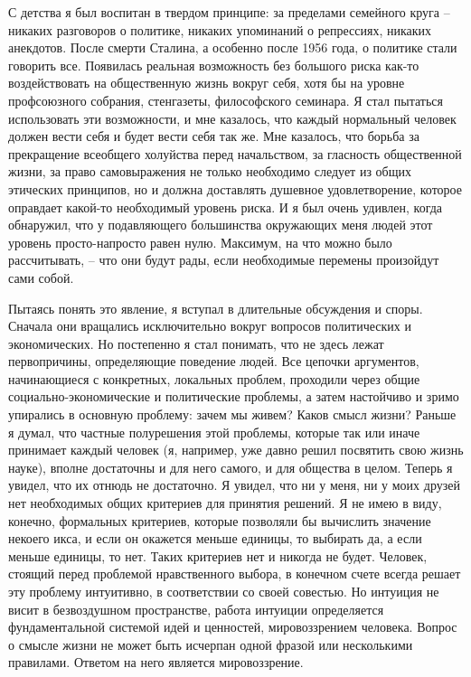 \documentclass{book}
\begin{document}
С детства я был воспитан в твердом принципе: за пределами семейного круга -- никаких разговоров о политике, никаких упоминаний о репрессиях, никаких анекдотов. После смерти Сталина, а особенно после 1956 года, о политике стали говорить все. Появилась реальная возможность без большого риска как-то воздействовать на общественную жизнь вокруг себя, хотя бы на уровне профсоюзного собрания, стенгазеты, фило­софского семинара. Я стал пытаться использовать эти возмож­ности, и мне казалось, что каждый нормальный человек должен вести себя и будет вести себя так же. Мне казалось, что борьба за прекращение всеобщего холуйства перед начальством, за гласность общественной жизни, за право самовыражения не только необходимо следует из общих этических принципов, но и должна доставлять душевное удовлетворение, которое оправдает какой-то необходимый уровень риска. И я был очень удивлен, когда обнаружил, что у подавляющего большинства окружающих меня людей этот уровень просто-напросто равен нулю. Максимум, на что можно было 
рассчитывать, -- что они будут рады, если необходимые перемены произойдут сами собой.

Пытаясь понять это явление, я вступал в длительные обсуж­дения и споры. Сначала они вращались исключительно вокруг вопросов политических и экономических. Но постепенно я стал понимать, что не здесь лежат первопричины, определяющие поведение людей. Все цепочки аргументов, начинающиеся с конкретных, локальных проблем, проходили через общие социально-экономические и политические проблемы, а затем настойчиво и зримо упирались в основную проблему: зачем мы живем? Каков смысл жизни? Раньше я думал, что частные полурешения этой проблемы, которые так или иначе принимает каждый человек (я, например, уже давно решил посвятить свою жизнь науке), вполне достаточны и для него самого, и для общества в целом. Теперь я увидел, что их отнюдь не достаточно. Я увидел, что ни у меня, ни у моих друзей нет необходимых общих критериев для принятия решений. Я не имею в виду, конечно, формальных  критериев, которые позволяли бы вычислить значение некоего икса, и если он окажется меньше единицы, то выбирать да,  а если меньше единицы,
 то нет.  Таких критериев нет и никогда не будет. Человек, стоящий перед проблемой нравственного выбора, в конечном счете всегда решает эту проблему интуитивно, в соответствии со своей совестью. Но интуиция не висит в безвоздушном пространстве, работа интуиции определяется фундаментальной системой идей и цен­ностей, мировоззрением человека. Вопрос о смысле жизни не может быть исчерпан одной фразой или несколькими правилами. Ответом на него является мировоззрение.
\end{document}
